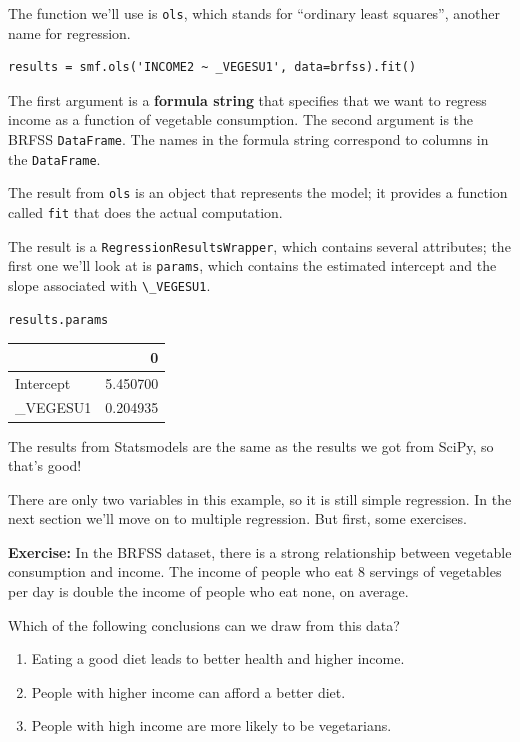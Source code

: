The function we'll use is \passthrough{\lstinline!ols!}, which stands
for ``ordinary least squares'', another name for regression.

\begin{lstlisting}[]
results = smf.ols('INCOME2 ~ _VEGESU1', data=brfss).fit()
\end{lstlisting}

The first argument is a \textbf{formula string} that specifies that we
want to regress income as a function of vegetable consumption. The
second argument is the BRFSS \passthrough{\lstinline!DataFrame!}. The
names in the formula string correspond to columns in the
\passthrough{\lstinline!DataFrame!}.

The result from \passthrough{\lstinline!ols!} is an object that
represents the model; it provides a function called
\passthrough{\lstinline!fit!} that does the actual computation.

The result is a \passthrough{\lstinline!RegressionResultsWrapper!},
which contains several attributes; the first one we'll look at is
\passthrough{\lstinline!params!}, which contains the estimated intercept
and the slope associated with \passthrough{\lstinline!\_VEGESU1!}.

\begin{lstlisting}[]
results.params
\end{lstlisting}

\begin{tabular}{lr}
\midrule
{} &         0 \\
\midrule
Intercept &  5.450700 \\
\_VEGESU1  &  0.204935 \\
\midrule
\end{tabular}

The results from Statsmodels are the same as the results we got from
SciPy, so that's good!

There are only two variables in this example, so it is still simple
regression. In the next section we'll move on to multiple regression.
But first, some exercises.

\textbf{Exercise:} In the BRFSS dataset, there is a strong relationship
between vegetable consumption and income. The income of people who eat 8
servings of vegetables per day is double the income of people who eat
none, on average.

Which of the following conclusions can we draw from this data?

\begin{enumerate}
\def\labelenumi{\Alph{enumi}.}
\item
  Eating a good diet leads to better health and higher income.
\item
  People with higher income can afford a better diet.
\item
  People with high income are more likely to be vegetarians.
\end{enumerate}

